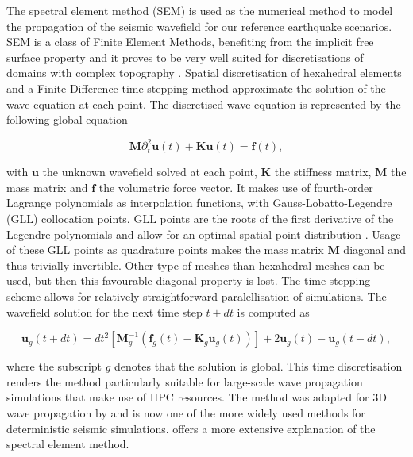 \documentclass[../Text/00main.tex]{subfiles}
\begin{document}
The spectral element method (SEM) is used as the numerical method to model the propagation of the seismic wavefield for our reference earthquake scenarios. SEM is a class of Finite Element Methods, benefiting from the implicit free surface property and it proves to be very well suited for discretisations of domains with complex topography \cite{fichtner_deep_2013}. Spatial discretisation of hexahedral elements and a Finite-Difference time-stepping method approximate the solution of the wave-equation at each point. The discretised wave-equation is represented by the following global equation

\begin{equation}
    \mathbf{M}\partial^2_t\mathbf{u}(t) +
    \mathbf{Ku}(t) =
    \mathbf{f}(t),
    \label{eq:mutkutglobal}
\end{equation}

with $\mathbf{u}$ the unknown wavefield solved at each point, $\mathbf{K}$ the stiffness matrix, $\mathbf{M}$ the mass matrix and $\mathbf{f}$ the volumetric force vector. It makes use of fourth-order Lagrange polynomials as interpolation functions, with Gauss-Lobatto-Legendre (GLL) collocation points. GLL points are the roots  of the first derivative of the Legendre polynomials and allow for an optimal spatial point distribution \cite{igel_spectral-element_2016}. Usage of these GLL points as quadrature points makes the mass matrix $\mathbf{M}$ diagonal and thus trivially invertible. Other type of meshes than hexahedral meshes can be used, but then this favourable diagonal property is lost. The time-stepping scheme allows for relatively straightforward paralellisation of simulations. The wavefield solution for the next time step $t + dt$ is computed as

\begin{equation}
\mathbf{u}_{g}(t+d t)= dt^{2}\left[\mathbf{M}_{g}^{-1}\left(\mathbf{f}_{g}(t)
-\mathbf{K}_{g} \mathbf{u}_{g}(t)\right)\right] 
+ 2 \mathbf{u}_{g}(t)-\mathbf{u}_{g}(t-d t) ,
\end{equation} 

where the subscript $g$ denotes that the solution is global. This time discretisation renders the method particularly suitable for large-scale wave propagation simulations that make use of HPC resources. The method was adapted for 3D wave propagation by \cite{komatitsch1999introduction} and is now one of the more widely used methods for deterministic seismic simulations. \cite{igel_spectral-element_2016} offers a more extensive explanation of the spectral element method. 
\end{document}
